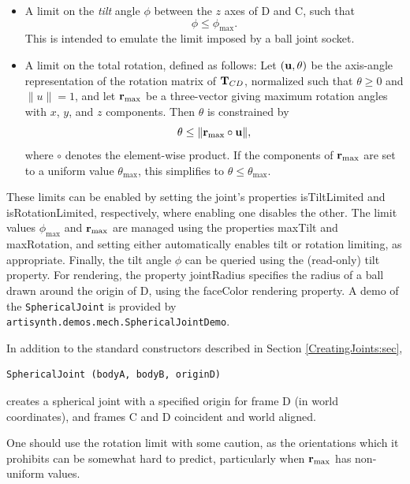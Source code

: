 \begin{itemize}

\item A limit on the {\it tilt} angle $\phi$ between
the $z$ axes of D and C, such that
%
\begin{equation}
\phi \le \phi_\text{max}.
\end{equation}
%
This is intended to emulate the limit imposed by a ball joint socket.

\item A limit on the total rotation, defined as follows: Let $({\bf u}, \theta)$
be the axis-angle representation of the rotation matrix of ${\bf T}_{CD}$,
normalized such that $\theta \ge 0$ and $\|u\| = 1$, and let
${\bf r}_\text{max}$ be a three-vector giving maximum rotation angles with
$x$, $y$, and $z$ components. Then $\theta$ is constrained by
%
\begin{equation}
\theta \le \| {\bf r}_\text{max} \circ {\bf u} \|,
\end{equation}
%
where $\circ$ denotes the element-wise product. If the components of
${\bf r}_\text{max}$ are set to a uniform value $\theta_\text{max}$, this
simplifies to $\theta \le \theta_\text{max}$.

\end{itemize}

These limits can be enabled by setting the joint's properties {\sf
isTiltLimited} and {\sf isRotationLimited}, respectively, where
enabling one disables the other. The limit values $\phi_\text{max}$
and ${\bf r}_\text{max}$ are managed using the properties {\sf maxTilt} and
{\sf maxRotation}, and setting either automatically enables tilt or
rotation limiting, as appropriate. Finally, the tilt angle $\phi$ can
be queried using the (read-only) {\sf tilt} property.  For rendering,
the property {\sf jointRadius} specifies the radius of a ball drawn
around the origin of D, using the {\sf faceColor} rendering
property. A demo of the {\tt SphericalJoint} is provided by {\tt
artisynth.demos.mech.SphericalJointDemo}.

In addition to the standard constructors described in
Section \ref{CreatingJoints:sec},
%
\begin{lstlisting}[]
  SphericalJoint (bodyA, bodyB, originD)
\end{lstlisting}
%
creates a spherical joint with a specified origin for frame D (in
world coordinates), and frames C and D coincident and world aligned.

\begin{sideblock}
One should use the rotation limit with some caution, as the
orientations which it prohibits can be somewhat hard to predict,
particularly when ${\bf r}_\text{max}$ has non-uniform values.
\end{sideblock}

